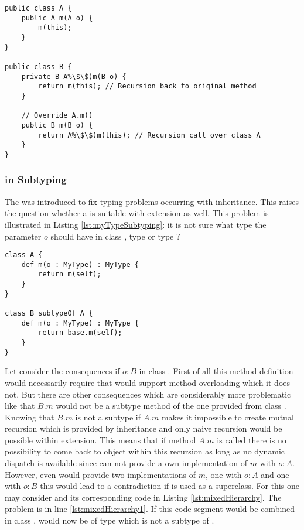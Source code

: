 \begin{lstlisting}[float,caption=Subclassing with \mytype translated to Java,label=lst:javaTransMyTypeSubclassing]
public class A {
	public A m(A o) {
		m(this);
	}
}

public class B {
	private B A%\$\$)m(B o) {
		return m(this); // Recursion back to original method
	}

	// Override A.m()
	public B m(B o) {
		return A%\$\$)m(this); // Recursion call over class A
	}
}
\end{lstlisting}

\subsubsection{\mytype in Subtyping}
\label{ssec:mytypeInSubtype}
The \mytype was introduced to fix typing problems occurring with
inheritance. This raises the question whether a \mytype is suitable
with extension as well. This problem is illustrated in Listing
\ref{lst:myTypeSubtyping}: it is not sure what type the parameter
$o$ should have in class \B, type \B or type \A? 

\begin{lstlisting}[float,language=ooplss,caption=\mytype within subtyping contexts,label=lst:myTypeSubtyping]
class A {
	def m(o : MyType) : MyType {
		return m(self);
	}
}

class B subtypeOf A {
	def m(o : MyType) : MyType {
		return base.m(self);
	}
}
\end{lstlisting}

Let consider the consequences if $o : B$ in class \B. First of all this
method definition would necessarily require that \ooplss would support
method overloading which it does not. But there are other consequences which
are considerably more problematic like that $B.m$ would not be a subtype method of the one
provided from class \A. Knowing that $B.m$ is not a subtype if $A.m$ 
makes it impossible to create mutual recursion which is provided by inheritance
and only naive recursion would be possible within extension. This means
that if method $A.m$ is called there is no possibility to come back to object \B 
within this recursion as long as no dynamic dispatch is available since \B can 
not provide a own implementation of $m$ with $o : A$. However, even \B would
provide two implementations of $m$, one with $o : A$ and one with $o : B$ this
would lead to a contradiction if \B is used as a superclass. For this one may
consider  and its corresponding code in Listing
\ref{lst:mixedHierarchy}. The problem is in line \ref{lst:mixedHierarchy1}. 
If this code segment would be combined in class \C, \self would now be of type
\C which is not a subtype of \A.

